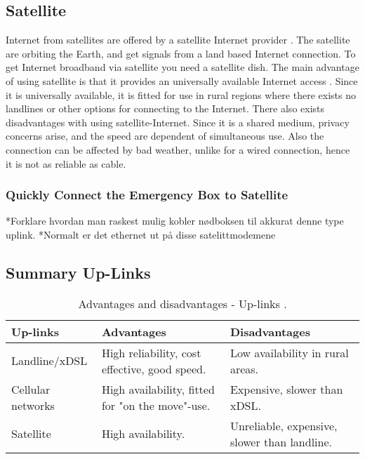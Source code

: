 \subsection{Satellite}
Internet from satellites are offered by a satellite Internet provider \cite{cablevssatellite}. The satellite are orbiting the Earth, and get signals from a land based Internet connection. To get Internet broadband via satellite you need a satellite dish. The main advantage of using satellite is that it provides an universally available Internet access \cite{broadband}. Since it is universally available, it is fitted for use in rural regions where there exists no landlines or other options for connecting to the Internet. There also exists disadvantages with using satellite-Internet. Since it is a shared medium, privacy concerns arise, and the speed are dependent of simultaneous use. Also the connection can be affected by bad weather, unlike for a wired connection, hence it is not as reliable as cable. 

\subsubsection{Quickly Connect the Emergency Box to Satellite}
*Forklare hvordan man raskest mulig kobler nødboksen til akkurat denne type uplink.
*Normalt er det ethernet ut på disse satelittmodemene

\subsection{Summary Up-Links}

\begin{center}
\begin{table}[!h]
\caption{\label{tab:uplinks}Advantages and disadvantages - Up-links \cite{comparisonuplinks}.}
    \begin{tabular}{ | l | p{4cm} | p{5cm} |}
    \hline
    \textbf{Up-links} & \textbf{Advantages} & \textbf{Disadvantages} \\ 
    \hline
    Landline/xDSL & High reliability, cost effective, good speed. & Low availability in rural areas. \\ 
    \hline
     Cellular networks & High availability, fitted for "on the move"-use. & Expensive, slower than xDSL.\\
    \hline
    Satellite & High availability.  & Unreliable, expensive, slower than landline.\\ 
    \hline
    \end{tabular}
   \end{table}
\end{center}

